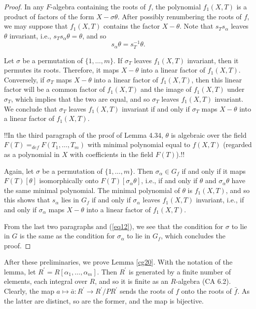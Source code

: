 \documentclass[a4paper,11pt,final,openany]{memoir}
\theoremstyle{nonumberplain}
\newtheorem{proof}{Proof.}
\begin{document}
\begin{proof}
In any $F$-algebra containing the roots of $f$, the polynomial $f_{1}(X,T)$ is
a product of factors of the form $X-\sigma\theta$. After possibly renumbering
the roots of $f$, we may suppose that $f_{1}(X,T)$ contains the factor
$X-\theta$. Note that $s_{T}s_{\alpha}$ leaves $\theta$ invariant, i.e.,
$s_{T}s_{\alpha}\theta=\theta$, and so
\begin{equation}
s_{\alpha}\theta=s_{T}^{-1}\theta. \label{eq12}%
\end{equation}


Let $\sigma$ be a permutation of $\{1,\ldots,m\}$. If $\sigma_{T}$ leaves
$f_{1}(X,T)$ invariant, then it permutes its roots. Therefore, it maps
$X-\theta$ into a linear factor of $f_{1}(X,T)$. Conversely, if $\sigma_{T}$
maps $X-\theta$ into a linear factor of $f_{1}(X,T)$, then this linear factor
will be a common factor of $f_{1}(X,T)$ and the image of $f_{1}(X,T)$ under
$\sigma_{T}$, which implies that the two are equal, and so $\sigma_{T}$ leaves
$f_{1}(X,T)$ invariant. We conclude that $\sigma_{T}$ leaves $f_{1}(X,T)$
invariant if and only if $\sigma_{T}$ maps $X-\theta$ into a linear factor of
$f_{1}(X,T)$.

!!In the third paragraph of the proof of Lemma 4.34, $\theta$ is algebraic
over the field $F(T)=_{def} F(T_{1},\ldots,T_{m})$ with minimal polynomial
equal to $f(X,T)$ (regarded as a polynomial in $X$ with coefficients in the
field $F(T)$).!!

Again, let $\sigma$ be a permutation of $\{1,\ldots,m\}$. Then $\sigma
_{\alpha}\in G_{f}$ if and only if it maps $F(T)[\theta]$ isomorphically onto
$F(T)[\sigma_{\alpha}\theta]$, i.e., if and only if $\theta$ and
$\sigma_{\alpha}\theta$ have the same minimal polynomial. The minimal
polynomial of $\theta$ is $f_{1}(X,T)$, and so this shows that $s_{\alpha}$
lies in $G_{f}$ if and only if $\sigma_{\alpha}$ leaves $f_{1}(X,T)$
invariant, i.e., if and only if $\sigma_{\alpha}$ maps $X-\theta$ into a
linear factor of $f_{1}(X,T)$.

From the last two paragraphs and (\ref{eq12}), we see that the condition for
$\sigma$ to lie in $G$ is the same as the condition for $\sigma_{\alpha}$ to
lie in $G_{f}$, which concludes the proof.
\end{proof}

After these preliminaries, we prove Lemma \ref{cg20}. With the notation of the
lemma, let $R^{\prime}=R[\alpha_{1},\ldots,\alpha_{m}]$. Then $R^{\prime}$ is
generated by a finite number of elements, each integral over $R$, and so it is
finite as an $R$-algebra (CA 6.2). Clearly, the map $a\mapsto\bar{a}\colon
R^{\prime}\rightarrow R^{\prime}/PR^{\prime}$ sends the roots of $f$ onto the
roots of $\bar{f}$. As the latter are distinct, so are the former, and the map
is bijective.
\end{document}
